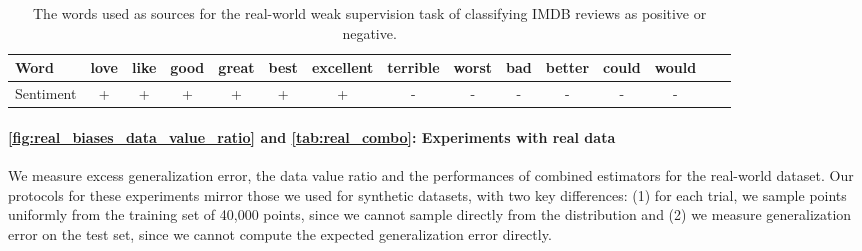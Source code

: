 \begin{table}[t]
\vskip 0.15in
\renewcommand{\arraystretch}{1.25} %
\begin{center}
\begin{small}
\begin{tabular}{l|cccccccccccccr}
\hline
Word & love & like & good & great & best & excellent & terrible & worst & bad & better & could & would \\
\hline
Sentiment & + & + & + & + & + & + & - & - & - & - & - & - \\
\hline
\end{tabular}
\end{small}
\end{center}
\vskip -0.1in
\caption{The words used as sources for the real-world weak supervision task of classifying IMDB reviews as positive or negative.}
\label{tab:imdb_words}
\end{table}

\paragraph{\autoref{fig:real_biases_data_value_ratio} and \autoref{tab:real_combo}: Experiments with real data} We measure excess generalization error, the data value ratio and the performances of combined estimators for the real-world dataset. Our protocols for these experiments mirror those we used for synthetic datasets, with two key differences: (1) for each trial, we sample points uniformly from the training set of 40,000 points, since we cannot sample directly from the distribution and (2) we measure generalization error on the test set, since we cannot compute the expected generalization error directly.